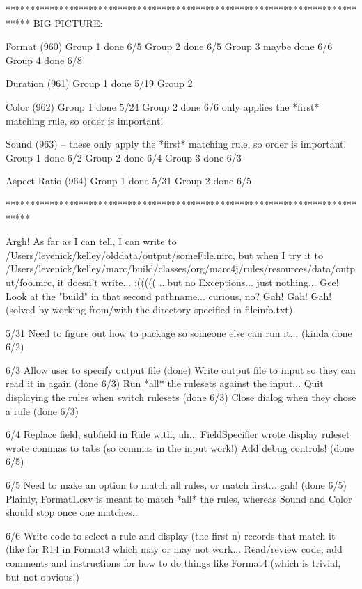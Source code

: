 *****************************************************************************
BIG PICTURE:

Format (960)
    Group 1 done 6/5
    Group 2 done 6/5
    Group 3 maybe done 6/6
    Group 4 done 6/8

Duration (961)
    Group 1 done 5/19
    Group 2

Color (962)
    Group 1 done 5/24
    Group 2 done 6/6        only applies the *first* matching rule, so order is important!

Sound (963) -- these only apply the *first* matching rule, so order is important!
    Group 1 done 6/2
    Group 2 done 6/4
    Group 3 done 6/3

Aspect Ratio (964)
    Group 1 done 5/31
    Group 2 done 6/5

*****************************************************************************

Argh! As far as I can tell, I can write to /Users/levenick/kelley/olddata/output/someFile.mrc, but when I try it
to /Users/levenick/kelley/marc/build/classes/org/marc4j/rules/resources/data/output/foo.mrc, it doesn't write... :((((( 
...but no Exceptions... just nothing...
Gee!  Look at the "build" in that second pathname... curious, no?
Gah! Gah! Gah!
(solved by working from/with the directory specified in fileinfo.txt)

5/31
Need to figure out how to package so someone else can run it... (kinda done 6/2)

6/3
Allow user to specify output file (done)
Write output file to input so they can read it in again (done 6/3)
Run *all* the rulesets against the input...
Quit displaying the rules when switch rulesets (done 6/3)
Close dialog when they chose a rule (done 6/3)

6/4
Replace field, subfield in Rule with, uh... FieldSpecifier
                                wrote display ruleset
                                wrote commas to tabs (so commas in the input work!)
Add debug controls! (done 6/5)

6/5
Need to make an option to match all rules, or match first... gah! (done 6/5)
    Plainly, Format1.csv is meant to match *all* the rules, whereas Sound and Color should stop once one matches...

6/6
Write code to select a rule and display (the first n) records that match it (like for R14 in Format3 which may or may not work...
Read/review code, add comments and instructions for how to do things like Format4 (which is trivial, but not obvious!)

